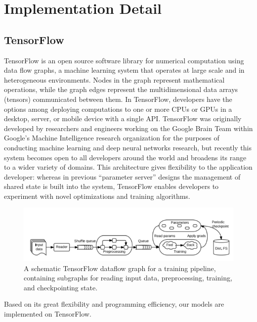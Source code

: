 \documentclass[12pt]{report} %
\begin{document}
\section{Implementation Detail}
\subsection{TensorFlow}
TensorFlow\cite{TF,TF2} is an open source software library for numerical computation using data flow graphs, a machine learning system that operates at large scale and in heterogeneous environments. Nodes in the graph represent mathematical operations, while the graph edges represent the multidimensional data arrays (tensors) communicated between them. In TensorFlow, developers have the options among deploying computations to one or more CPUs or GPUs in a desktop, server, or mobile device with a single API. TensorFlow was originally developed by researchers and engineers working on the Google Brain Team within Google's Machine Intelligence research organization for the purposes of conducting machine learning and deep neural networks research, but recently this system becomes open to all developers around the world and broadens its range to a wider variety of domains. This architecture gives flexibility to the application developer: whereas in previous “parameter server” designs the management of shared state is built into the system, TensorFlow enables developers to experiment with novel optimizations and training algorithms. \\
\begin{figure}[H]
	\centering
	\includegraphics[scale=1.0]{pictures/tensorflow.png}
	\caption{A schematic TensorFlow dataflow graph for a training pipeline, containing subgraphs for reading input data, preprocessing, training, and checkpointing state\cite{TFPIC}.}
	\label{fig:3}
\end{figure}
Based on its great flexibility and programming efficiency, our models are implemented on TensorFlow. 
\end{document}
